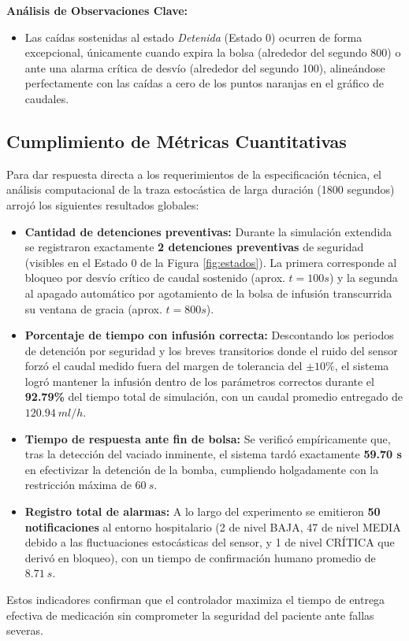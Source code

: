 \textbf{Análisis de Observaciones Clave:}
\begin{itemize}
    \item Las caídas sostenidas al estado \textit{Detenida} (Estado 0) ocurren de forma excepcional, únicamente cuando expira la bolsa (alrededor del segundo 800) o ante una alarma crítica de desvío (alrededor del segundo 100), alineándose perfectamente con las caídas a cero de los puntos naranjas en el gráfico de caudales.
\end{itemize}

\subsection{Cumplimiento de Métricas Cuantitativas}
\label{sec:metricas_cuantitativas}

Para dar respuesta directa a los requerimientos de la especificación técnica, el análisis computacional de la traza estocástica de larga duración (1800 segundos) arrojó los siguientes resultados globales:

\begin{itemize}
    \item \textbf{Cantidad de detenciones preventivas:} Durante la simulación extendida se registraron exactamente \textbf{2 detenciones preventivas} de seguridad (visibles en el Estado 0 de la Figura \ref{fig:estados}). La primera corresponde al bloqueo por desvío crítico de caudal sostenido (aprox. $t=100s$) y la segunda al apagado automático por agotamiento de la bolsa de infusión transcurrida su ventana de gracia (aprox. $t=800s$).
    
    \item \textbf{Porcentaje de tiempo con infusión correcta:} Descontando los periodos de detención por seguridad y los breves transitorios donde el ruido del sensor forzó el caudal medido fuera del margen de tolerancia del $\pm 10\%$, el sistema logró mantener la infusión dentro de los parámetros correctos durante el \textbf{92.79\%} del tiempo total de simulación, con un caudal promedio entregado de $120.94~ml/h$.

    \item \textbf{Tiempo de respuesta ante fin de bolsa:} Se verificó empíricamente que, tras la detección del vaciado inminente, el sistema tardó exactamente \textbf{59.70 s} en efectivizar la detención de la bomba, cumpliendo holgadamente con la restricción máxima de $60~s$.
    
    \item \textbf{Registro total de alarmas:} A lo largo del experimento se emitieron \textbf{50 notificaciones} al entorno hospitalario (2 de nivel BAJA, 47 de nivel MEDIA debido a las fluctuaciones estocásticas del sensor, y 1 de nivel CRÍTICA que derivó en bloqueo), con un tiempo de confirmación humano promedio de $8.71~s$.
\end{itemize}

Estos indicadores confirman que el controlador maximiza el tiempo de entrega efectiva de medicación sin comprometer la seguridad del paciente ante fallas severas.